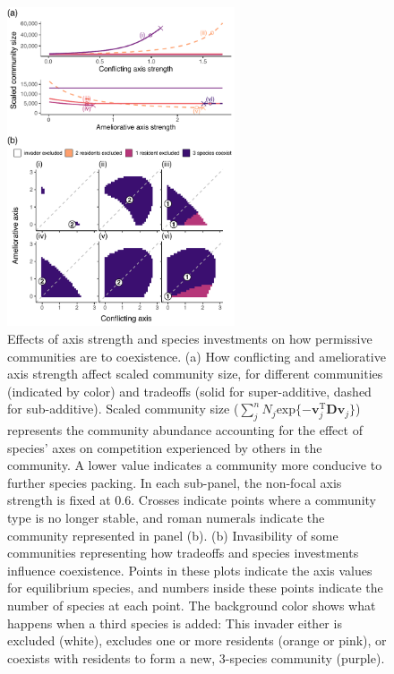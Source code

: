 \documentclass[12pt]{article}
\begin{document}
\begin{figure}[ht!]
\centering
\includegraphics[width=0.6\textwidth,keepaspectratio]{3-comm.pdf}
\caption{Effects of axis strength and species investments on 
how permissive communities are to coexistence.
(a) How conflicting and ameliorative axis strength affect scaled community size,
for different communities (indicated by color) and tradeoffs
(solid for super-additive, dashed for sub-additive).
Scaled community size
($\sum_j^n{N_j \text{exp} \{ -\mathbf{v}_{j}^{\text{T}} \mathbf{D} \mathbf{v}_j \}}$)
represents the community abundance accounting
for the effect of species' axes on competition experienced by others in the
community. 
A lower value indicates a community more conducive to further species packing.
In each sub-panel, the non-focal axis strength is fixed at 0.6.
Crosses indicate points where a community type is no longer stable,
and roman numerals indicate the community represented in panel (b).
(b) Invasibility of some communities representing how tradeoffs and species
investments influence coexistence.
Points in these plots indicate the axis values for equilibrium species, and 
numbers inside these points indicate the number of species at each point.
The background color shows what happens when a third species is added:
This invader either is excluded (white), 
excludes one or more residents (orange or pink), or 
coexists with residents to form a new, 3-species community (purple).
}
\label{fig:comms-d}
\end{figure}
\end{document}
